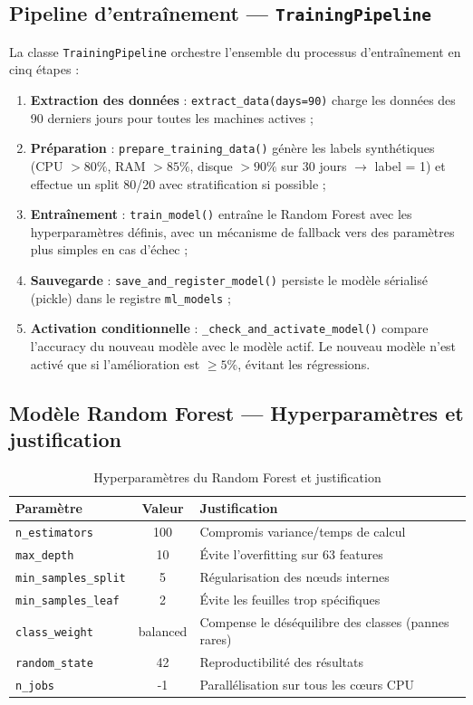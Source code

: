 \subsection{Pipeline d'entraînement — \texttt{TrainingPipeline}}

La classe \texttt{TrainingPipeline} orchestre l'ensemble du processus d'entraînement
en cinq étapes :

\begin{enumerate}
  \item \textbf{Extraction des données} : \texttt{extract\_data(days=90)} charge les
        données des 90 derniers jours pour toutes les machines actives ;
  \item \textbf{Préparation} : \texttt{prepare\_training\_data()} génère les labels
        synthétiques (CPU $> 80\%$, RAM $> 85\%$, disque $> 90\%$ sur 30 jours $\rightarrow$
        label = 1) et effectue un split 80/20 avec stratification si possible ;
  \item \textbf{Entraînement} : \texttt{train\_model()} entraîne le Random Forest avec
        les hyperparamètres définis, avec un mécanisme de fallback vers des paramètres
        plus simples en cas d'échec ;
  \item \textbf{Sauvegarde} : \texttt{save\_and\_register\_model()} persiste le modèle
        sérialisé (pickle) dans le registre \texttt{ml\_models} ;
  \item \textbf{Activation conditionnelle} : \texttt{\_check\_and\_activate\_model()}
        compare l'accuracy du nouveau modèle avec le modèle actif. Le nouveau modèle
        n'est activé que si l'amélioration est $\geq 5\%$, évitant les régressions.
\end{enumerate}

\subsection{Modèle Random Forest — Hyperparamètres et justification}

\begin{table}[H]
\centering
\caption{Hyperparamètres du Random Forest et justification}
\begin{tabularx}{\textwidth}{|l|c|X|}
\hline
\rowcolor{lightblue}
\textbf{Paramètre} & \textbf{Valeur} & \textbf{Justification} \\
\hline
\texttt{n\_estimators} & 100 & Compromis variance/temps de calcul \\
\hline
\texttt{max\_depth} & 10 & Évite l'overfitting sur 63 features \\
\hline
\texttt{min\_samples\_split} & 5 & Régularisation des nœuds internes \\
\hline
\texttt{min\_samples\_leaf} & 2 & Évite les feuilles trop spécifiques \\
\hline
\texttt{class\_weight} & balanced & Compense le déséquilibre des classes (pannes rares) \\
\hline
\texttt{random\_state} & 42 & Reproductibilité des résultats \\
\hline
\texttt{n\_jobs} & -1 & Parallélisation sur tous les cœurs CPU \\
\hline
\end{tabularx}
\end{table}

